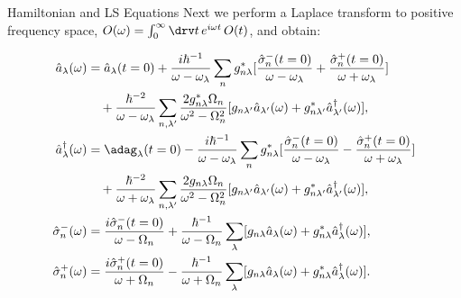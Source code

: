 \documentclass{beamer}
\begin{document}
\begin{frame}{Hamiltonian and LS Equations}
Next we perform a Laplace transform to positive frequency space,
$O(\omega)=\int_0^\infty \drv t\, e^{i\omega t}\, O(t)$, and obtain:
\begin{center}
\fontsize{7.8}{-0.2}\selectfont
\begin{align}
{\hat{a}_\lambda(\omega)}&= \hat{a}_\lambda(t=0) + \frac{i\hbar^{-1}}{\omega-\omega_\lambda}
\sum_n g_{n\lambda}^*[\frac{\hat{\sigma}_n^-(t=0)}{\omega-\omega_\lambda}
+\frac{\hat{\sigma}_n^+(t=0)}{\omega+\omega_\lambda}]\nonumber\\
& \quad + \frac{\hbar^{-2}}{\omega-\omega_\lambda}
\sum_{n,\lambda'} \frac{2g_{n\lambda}^*\Omega_n}{\omega^2-\Omega_n^2} [g_{n\lambda'}
\hat{a}_{\lambda'}(\omega)+g_{n\lambda'}^*\hat{a}_{\lambda'}^\dagger(\omega)], \label{eq:aw} \\
{\hat{a}_\lambda^\dagger(\omega)}&=\adag_\lambda(t=0) - \frac{i\hbar^{-1}}{\omega-\omega_\lambda}
\sum_n g_{n\lambda}^*[\frac{\hat{\sigma}_n^-(t=0)}{\omega-\omega_\lambda}
-\frac{\hat{\sigma}_n^+(t=0)}{\omega+\omega_\lambda}]\nonumber\\
& \quad + \frac{\hbar^{-2}}{\omega+\omega_\lambda}
\sum_{n,\lambda'} \frac{2g_{n\lambda}\Omega_n}{\omega^2-\Omega_n^2} [g_{n\lambda'}
\hat{a}_{\lambda'}(\omega)+g_{n\lambda'}^*\hat{a}_{\lambda'}^\dagger(\omega)],
\label{eq:adaggerw} \\
\hat{\sigma}_n^-(\omega)&=\frac{i\hat{\sigma}_n^-(t=0)}
{\omega-\Omega_n}+\frac{\hbar^{-1}}{\omega-\Omega_n}
\sum_{\lambda}[g_{n\lambda}
\hat{a}_\lambda(\omega)+g_{n\lambda}^*\hat{a}_\lambda^\dagger(\omega)], \label{eq:sig-w} \\
\hat{\sigma}_n^+(\omega)&=\frac{i\hat{\sigma}_n^+(t=0)}
{\omega+\Omega_n}-\frac{\hbar^{-1}}{\omega+\Omega_n} \sum_{\lambda}[g_{n\lambda}
\hat{a}_\lambda(\omega)+g_{n\lambda}^*\hat{a}_\lambda^\dagger(\omega)]. \label{eq:sig+w}
\end{align}
\end{center}
\end{frame}
\end{document}
